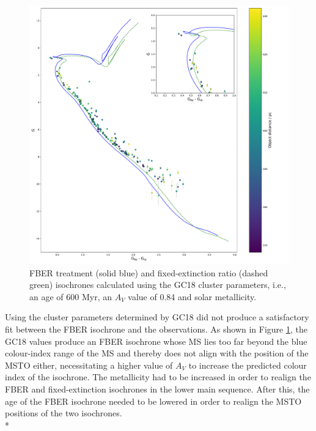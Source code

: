 \documentclass[12pt, a4paper]{report}
\begin{document}
\begin{figure}[h!]
\begin{center}
\includegraphics[width=1.0\textwidth]{../NGC_6793_CMD_FeH_0p002_Av_0p84_600Myr_isochrones_summary_errorbars.pdf}
\caption{FBER treatment (solid blue) and fixed-extinction ratio (dashed green) isochrones calculated using the GC18 cluster parameters, i.e., an age of 600 Myr, an $A_{V}$ value of 0.84 and solar metallicity.}
\label{NGC_6793_gc18_params_function}
\end{center}
\end{figure}

Using the cluster parameters determined by GC18 did not produce a satisfactory fit between the FBER isochrone and the observations. As shown in Figure \ref{NGC_6793_gc18_params_function}, the GC18 values produce an FBER isochrone whose MS lies too far beyond the blue colour-index range of the MS and thereby does not align with the position of the MSTO either, necessitating a higher value of $A_{V}$ to increase the predicted colour index of the isochrone. The metallicity had to be increased in order to realign the FBER and fixed-extinction isochrones in the lower main sequence. After this, the age of the FBER isochrone needed to be lowered in order to realign the MSTO positions of the two isochrones.\\*
\end{document}
